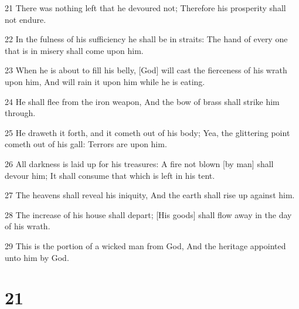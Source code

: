 \par 21 There was nothing left that he devoured not; Therefore his prosperity shall not endure.
\par 22 In the fulness of his sufficiency he shall be in straits: The hand of every one that is in misery shall come upon him.
\par 23 When he is about to fill his belly, [God] will cast the fierceness of his wrath upon him, And will rain it upon him while he is eating.
\par 24 He shall flee from the iron weapon, And the bow of brass shall strike him through.
\par 25 He draweth it forth, and it cometh out of his body; Yea, the glittering point cometh out of his gall: Terrors are upon him.
\par 26 All darkness is laid up for his treasures: A fire not blown [by man] shall devour him; It shall consume that which is left in his tent.
\par 27 The heavens shall reveal his iniquity, And the earth shall rise up against him.
\par 28 The increase of his house shall depart; [His goods] shall flow away in the day of his wrath.
\par 29 This is the portion of a wicked man from God, And the heritage appointed unto him by God.

\chapter{21}

